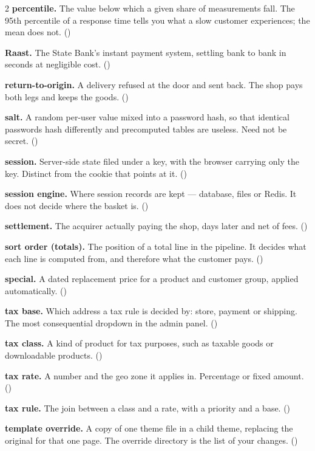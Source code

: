 \begin{multicols}{2}
\textbf{percentile.} The value below which a given share of measurements fall.
The 95th percentile of a response time tells you what a slow customer
experiences; the mean does not. ()

\textbf{Raast.} The State Bank's instant payment system, settling bank to bank
in seconds at negligible cost. ()

\textbf{return-to-origin.} A delivery refused at the door and sent back. The
shop pays both legs and keeps the goods. ()

\textbf{salt.} A random per-user value mixed into a password hash, so that
identical passwords hash differently and precomputed tables are useless. Need
not be secret. ()

\textbf{session.} Server-side state filed under a key, with the browser
carrying only the key. Distinct from the cookie that points at it.
()

\textbf{session engine.} Where session records are kept --- database, files or
Redis. It does not decide where the basket is. ()

\textbf{settlement.} The acquirer actually paying the shop, days later and net
of fees. ()

\textbf{sort order (totals).} The position of a total line in the pipeline. It
decides what each line is computed from, and therefore what the customer pays.
()

\textbf{special.} A dated replacement price for a product and customer group,
applied automatically. ()

\textbf{tax base.} Which address a tax rule is decided by: store, payment or
shipping. The most consequential dropdown in the admin panel.
()

\textbf{tax class.} A kind of product for tax purposes, such as taxable goods
or downloadable products. ()

\textbf{tax rate.} A number and the geo zone it applies in. Percentage or fixed
amount. ()

\textbf{tax rule.} The join between a class and a rate, with a priority and a
base. ()

\textbf{template override.} A copy of one theme file in a child theme,
replacing the original for that one page. The override directory is the list of
your changes. ()


\end{multicols}
